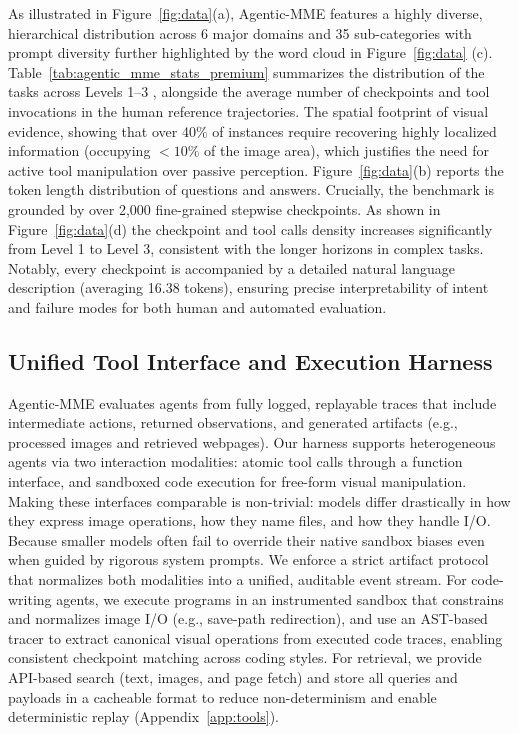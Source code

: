 \documentclass[runningheads]{llncs}
\theoremstyle{plain}
\theoremstyle{definition}
\theoremstyle{remark}
\begin{document}
As illustrated in Figure~\ref{fig:data}(a), Agentic-MME features a highly diverse, hierarchical distribution across 6 major domains and 35 sub-categories with prompt diversity further highlighted by the word cloud in Figure~\ref{fig:data} (c). Table~\ref{tab:agentic_mme_stats_premium} summarizes the distribution of the  tasks across Levels 1--3 , alongside the average number of checkpoints and tool invocations in the human reference trajectories. The spatial footprint of visual evidence, showing that over 40\% of instances require recovering highly localized information (occupying $<10\%$ of the image area), which justifies the need for active tool manipulation over passive perception. Figure~\ref{fig:data}(b) reports the token length distribution of questions and answers. Crucially, the benchmark is grounded by over 2,000 fine-grained stepwise checkpoints. As shown in Figure~\ref{fig:data}(d) the checkpoint and tool calls density increases significantly from Level 1 to Level 3, consistent with the longer horizons in complex tasks. Notably, every checkpoint is accompanied by a detailed natural language description (averaging 16.38 tokens), ensuring precise interpretability of intent and failure modes for both human and automated evaluation.
\subsection{Unified Tool Interface and Execution Harness}
\label{sec:harness}
Agentic-MME evaluates agents from fully logged, replayable traces that include intermediate actions, returned observations, and generated artifacts (e.g., processed images and retrieved webpages). Our harness supports heterogeneous agents via two interaction modalities: atomic tool calls through a function interface, and sandboxed code execution for free-form visual manipulation. Making these interfaces comparable is non-trivial: models differ drastically in how they express image operations, how they name files, and how they handle I/O. Because smaller models often fail to override their native sandbox biases even when guided by rigorous system prompts. We enforce a strict artifact protocol that normalizes both modalities into a unified, auditable event stream. For code-writing agents, we execute programs in an instrumented sandbox that constrains and normalizes image I/O (e.g., save-path redirection), and use an AST-based tracer to extract canonical visual operations from executed code traces, enabling consistent checkpoint matching across coding styles. For retrieval, we provide API-based search (text, images, and page fetch) and store all queries and payloads in a cacheable format to reduce non-determinism and enable deterministic replay (Appendix~\ref{app:tools}).
\end{document}

